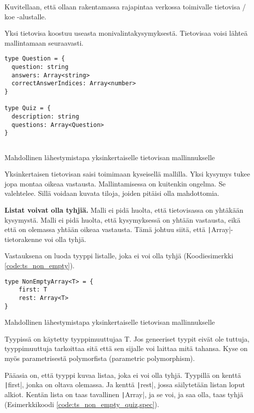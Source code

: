 Kuvitellaan, että ollaan rakentamassa rajapintaa verkossa toimivalle tietovisa / koe -alustalle.

Yksi tietovisa koostuu useasta monivalintakysymyksestä. Tietovisaa voisi lähteä mallintamaan seuraavasti.

\begin{code}
    \begin{verbatim}
type Question = {
  question: string
  answers: Array<string>
  correctAnswerIndices: Array<number>
}

type Quiz = {
  description: string
  questions: Array<Question>
}
         
\end{verbatim}
    \caption{Mahdollinen lähestymistapa yksinkertaiselle tietovisan mallinnukselle}
    \label{code:ts_first_quiz}
\end{code}

Yksinkertaisen tietovisan saisi toimimaan kyseisellä mallilla. Yksi kysymys tukee jopa montaa oikeaa vastausta.
Mallintamisessa on kuitenkin ongelma. Se valehtelee. Sillä voidaan kuvata tiloja, joiden pitäisi olla mahdottomia.

\textbf{Listat voivat olla tyhjiä.} Malli ei pidä huolta, että tietovisassa on yhtäkään kysymystä. Malli ei pidä huolta, että kysymyksessä on yhtään vastausta, eikä että on olemassa yhtään oikeaa vastausta. Tämä johtuu siitä, että \texttt|Array|-tietorakenne voi olla tyhjä.

Vastauksena on luoda tyyppi listalle, joka ei voi olla tyhjä (Koodiesimerkki \ref{code:ts_non_empty}).

\begin{code}
    \begin{verbatim}
type NonEmptyArray<T> = {
    first: T
    rest: Array<T>
}
    \end{verbatim}
    \caption{Mahdollinen lähestymistapa yksinkertaiselle tietovisan mallinnukselle}
    \label{code:ts_non_empty}
\end{code}

Tyypissä on käytetty tyyppimuuttujaa T. Jos geneeriset tyypit eivät ole tuttuja, tyyppimuuttuja tarkoittaa sitä että sen sijalle voi laittaa mitä tahansa. Kyse on myös parametrisestä polymorfista (parametric polymorphism).

Pääasia on, että tyyppi kuvaa listaa, joka ei voi olla tyhjä. Tyypillä on kenttä \texttt|first|, jonka on oltava olemassa. Ja kenttä \texttt|rest|, jossa säilytetään listan loput alkiot. Kentän lista on taas tavallinen \texttt|Array|, ja se voi, ja saa olla, taas tyhjä (Esimerkkikoodi \ref{code:ts_non_empty_quiz,spec}).


